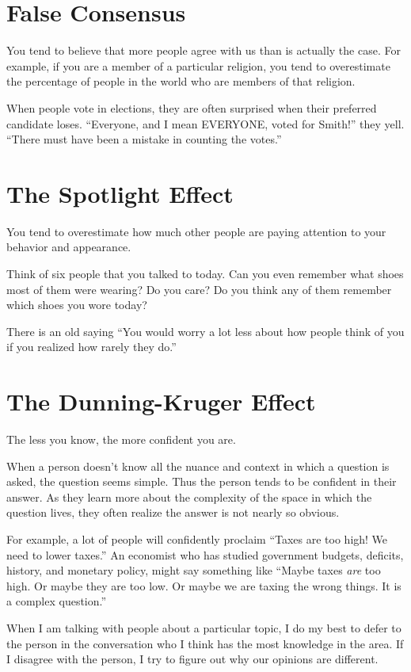 \section{False Consensus}

You tend to believe that more people agree with us than is actually
the case. For example, if you are a member of a particular religion,
you tend to overestimate the percentage of people in the world who are
members of that religion.

When people vote in elections, they are often surprised when their
preferred candidate loses. ``Everyone, and I mean EVERYONE, voted for
Smith!'' they yell.  ``There must have been a mistake in counting the
votes.''

\section{The Spotlight Effect}

You tend to overestimate how much other people are paying attention to
your behavior and appearance.

Think of six people that you talked to today.  Can you even remember what
shoes most of them were wearing? Do you care? Do you think any of them
remember which shoes you wore today?

There is an old saying ``You would worry a lot less about how people
think of you if you realized how rarely they do.''

\section{The Dunning-Kruger Effect}

The less you know, the more confident you are.

When a person doesn't know all the nuance and context in which a question is
asked, the question seems simple. Thus the person tends to be confident in
their answer.  As they learn more about the complexity of the space in
which the question lives, they often realize the answer is not nearly so
obvious.

For example, a lot of people will confidently proclaim ``Taxes are too
high! We need to lower taxes.''  An economist who has studied
government budgets, deficits, history, and monetary policy, might say
something like ``Maybe taxes \emph{are} too high.  Or maybe they are
too low. Or maybe we are taxing the wrong things. It is a 
complex question.''

When I am talking with people about a particular topic, I do my best
to defer to the person in the conversation who I think has the most
knowledge in the area. If I disagree with the person, I try to figure
out why our opinions are different.

